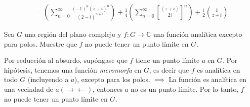 \begin{problema}
\begin{enumerate}
\begin{sol}
\begin{enumerate}
\begin{enumerate}
\begin{align*}
                             &= \left(\sum_{n=0}^\infty \frac{(-1)^n(z+i)^n}{(2-i)^{n+1}}\right)+\frac{1}{4}\left(\sum_{n=0}^\infty \left[\frac{(z+i)}{2i}\right]^n\right)+\frac{i}{2}\left(\frac{1}{z+i}\right)
                            \end{align*}
                \end{enumerate}
            \end{enumerate}
        \end{sol}
    \end{enumerate}
\end{problema}

\begin{problema}
    Sea $G$ una región del plano complejo y $f: G \rightarrow \mathbb{C}$ una función analítica excepto para polos. Muestre que $f$ no puede tener un punto límite en $G$.
    \begin{sol}
        Por reducción al absurdo, supóngase que $f$ tiene un punto límite $a$ en $G$. Por hipótesis, tenemos una función \textit{meromorfa} en $G$, es decir que $f$ es analítica en todo $G$ (incluyendo a $a$), excepto para los polos. $\implies$ La función es analítica en una vecindad de $a(\to\gets)$, entonces $a$ no es un punto límite. Por lo tanto, $f$ no puede tener un punto límite en $G$.
    \end{sol}
\end{problema}

